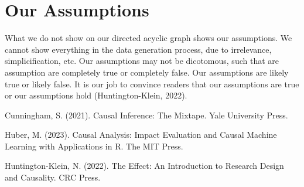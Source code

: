 \documentclass[
]{book}
\begin{document}
\section{Our Assumptions}\label{our-assumptions}

What we do not show on our directed acyclic graph shows our assumptions. We cannot show everything in the data generation process, due to irrelevance, simplicification, etc. Our assumptions may not be dicotomous, such that are assumption are completely true or completely false. Our assumptions are likely true or likely false. It is our job to convince readers that our assumptions are true or our assumptions hold (Huntington-Klein, 2022).

Cunningham, S. (2021). Causal Inference: The Mixtape. Yale University Press.

Huber, M. (2023). Causal Analysis: Impact Evaluation and Causal Machine Learning with Applications in R. The MIT Press.

Huntington-Klein, N. (2022). The Effect: An Introduction to Research Design and Causality. CRC Press.


\end{document}
